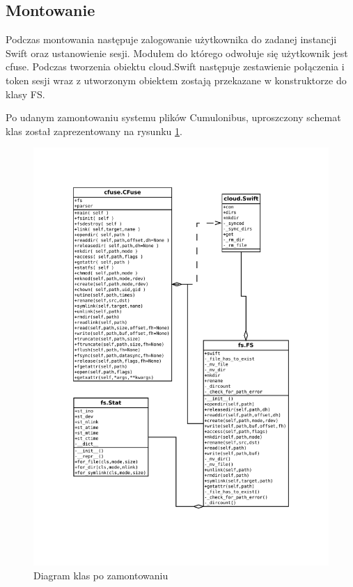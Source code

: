 \subsection{Montowanie}

Podczas montowania następuje zalogowanie użytkownika do zadanej instancji Swift oraz ustanowienie sesji. Modułem do którego odwołuje się użytkownik jest cfuse. Podczas tworzenia obiektu cloud.Swift następuje zestawienie połączenia i token sesji wraz z utworzonym obiektem zostają przekazane w konstruktorze do klasy FS. 

Po udanym zamontowaniu systemu plików Cumulonibus, uproszczony schemat klas został zaprezentowany na rysunku \ref{fig:dia_arch_klasy}.

\begin{figure}[htb]
\begin{center}
\leavevmode
\includegraphics[width=\textwidth]{arch_klasy.pdf}
\end{center}
\caption{Diagram klas po zamontowaniu}
\label{fig:dia_arch_klasy}
\end{figure}


